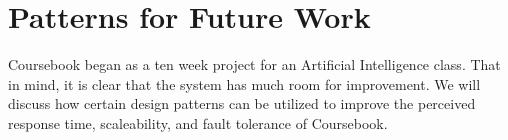 \section{Patterns for Future Work}

Coursebook began as a ten week project for an Artificial Intelligence class.
That in mind, it is clear that the system has much room for improvement. We will
discuss how certain design patterns can be utilized to improve the perceived
response time, scaleability, and fault tolerance of Coursebook.



